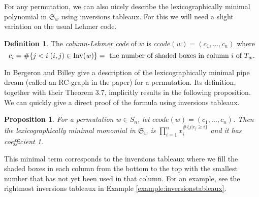 \documentclass{article}
\newtheorem{proposition}[theorem]{Proposition}
\theoremstyle{definition}
\newtheorem{definition}[theorem]{Definition} %
\begin{document}
For any permutation, we can also nicely describe the lexicographically minimal polynomial in $\mathfrak{S}_w$ using inversions tableaux. For this we will need a slight variation on the usual Lehmer code. 

\begin{definition}
    The \emph{column-Lehmer code} of $w$ is $ccode(w) = (c_1, \dots, c_n)$ where 
    $$c_i =  \# \{j < i | (i,j) \in \mathrm{Inv}(w)\} = \text{ the number of shaded boxes in column $i$ of } T_w.$$ 
\end{definition}

In \cite[\S 3]{bergeron1993rc} 
 Bergeron and Billey give a description of the lexicographically minimal pipe dream (called an RC-graph in the paper) for a permutation. Its definition, together with their Theorem 3.7, implicitly results in the following proposition. We can quickly give a direct proof of the formula using inversions tableaux.

\begin{proposition}
    For a permutation $w \in S_n$, let $ccode(w) = (c_1, \dots ,c_n)$. Then the lexicographically minimal monomial in $\mathfrak{S}_w$ is $\prod\limits_{i=1}^n x_i^{\#\{j | c_j \geq i \}}$ and it has coefficient 1.
\end{proposition}
    
 This minimal term corresponds to the inversions tableaux where we fill the shaded boxes in each column from the bottom to the top with the smallest number that has not yet been used in that column. For an example, see the rightmost inversions tableaux in Example \ref{example:inversionstableaux}.
\end{document}
